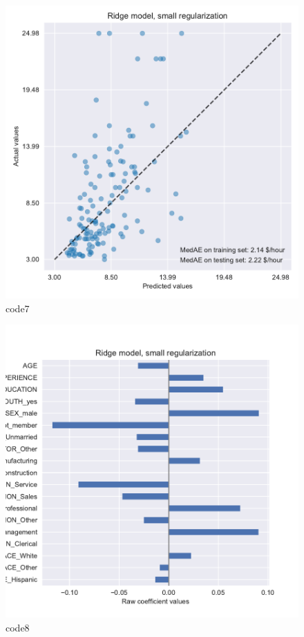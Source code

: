 \begin{figure}[htbp]
	\centering
	\includegraphics[width=14cm]{codeimage/code7}
	\caption{code7}
	\label{code7}
\end{figure}

\begin{figure}[htbp]
	\centering
	\includegraphics[width=14cm]{codeimage/code8}
	\caption{code8}
	\label{code8}
\end{figure}

